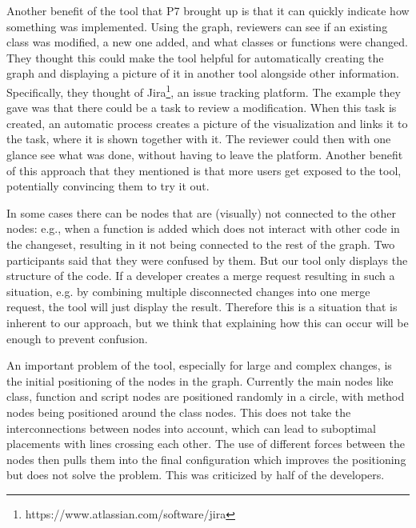 \documentclass[a4paper,11pt,twoside]{article}
\theoremstyle{definition} %
\begin{document}
Another benefit of the tool that P7 brought up is that it can quickly indicate how something was implemented. Using the graph, reviewers can see if an existing class was modified, a new one added, and what classes or functions were changed. They thought this could make the tool helpful for automatically creating the graph and displaying a picture of it in another tool alongside other information. Specifically, they thought of Jira\footnote{https://www.atlassian.com/software/jira}, an issue tracking platform. The example they gave was that there could be a task to review a modification. When this task is created, an automatic process creates a picture of the visualization and links it to the task, where it is shown together with it. The reviewer could then with one glance see what was done, without having to leave the platform. Another benefit of this approach that they mentioned is that more users get exposed to the tool, potentially convincing them to try it out.

In some cases there can be nodes that are (visually) not connected to the other nodes: e.g., when a function is added which does not interact with other code in the changeset, resulting in it not being connected to the rest of the graph. Two participants said that they were confused by them. But our tool only displays the structure of the code. If a developer creates a merge request resulting in such a situation, e.g. by combining multiple disconnected changes into one merge request, the tool will just display the result. Therefore this is a situation that is inherent to our approach, but we think that explaining how this can occur will be enough to prevent confusion.

An important problem of the tool, especially for large and complex changes, is the initial positioning of the nodes in the graph. Currently the main nodes like class, function and script nodes are positioned randomly in a circle, with method nodes being positioned around the class nodes. This does not take the interconnections between nodes into account, which can lead to suboptimal placements with lines crossing each other. The use of different forces between the nodes then pulls them into the final configuration which improves the positioning but does not solve the problem. This was criticized by half of the developers.
\end{document}
